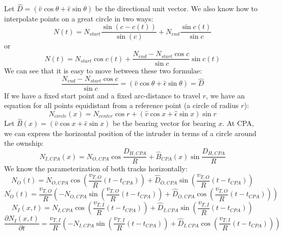 Let \(\hat{D} = (\hat{v}\cos{\theta}+\hat{\epsilon}\sin{\theta})\) be the directional unit vector. We also know how to interpolate points on a great circle in two ways:
\begin{equation}
    N(t) = N_{start}\frac{\sin{(c-c(t))}}{\sin(c)} + N_{end}\frac{\sin{c(t)}}{\sin{c}}
\end{equation}
or
\begin{equation}
    N(t) = N_{start}\cos{c(t)} + \frac{N_{end}-N_{start}\cos{c}}{\sin{c}}\sin{c(t)}
\end{equation}
We can see that it is easy to move between these two formulae:
\begin{equation}
    \frac{N_{end}-N_{start}\cos{c}}{\sin{c}} = (\hat{v}\cos{\theta + \hat{\epsilon}}\sin{\theta}) = \hat{D}
\end{equation}
If we have a fixed start point and a fixed arc-distance to travel \(r\), we have an equation for all points equidistant from a reference point (a circle of radius \(r\)):
\begin{equation}
    N_{circle}(x) = N_{center}\cos{r} + (\hat{v}\cos{x} + \hat{\epsilon}\sin{x})\sin{r}
\end{equation}
Let \(\hat{B}(x) = (\hat{v}\cos{x} + \hat{\epsilon}\sin{x})\) be the bearing vector for bearing \(x\). At CPA, we can express the horizontal position of the intruder in terms of a circle around the ownship:
\begin{equation}
\label{eq:nicpa}
    N_{I,CPA}(x) = N_{O,CPA}\cos{\frac{D_{H,CPA}}{R}} + \hat{B}_{CPA}(x)\sin{\frac{D_{H,CPA}}{R}}
\end{equation}
We know the parameterization of both tracks horizontally:
\begin{equation}
    N_{O}(t) = N_{O,CPA}\cos{\left( \frac{v_{T,O}}{R}(t-t_{CPA}) \right)} + \hat{D}_{O,CPA}\sin{\left( \frac{v_{T,O}}{R}(t-t_{CPA}) \right)}
\end{equation}
\begin{equation}
    N^{'}_{O}(t) = \frac{v_{T,O}}{R} \left(-N_{O,CPA} \sin{\left( \frac{v_{T,O}}{R}(t-t_{CPA}) \right)} + \hat{D}_{O,CPA}\cos{\left( \frac{v_{T,O}}{R}(t-t_{CPA}) \right)} \right)
\end{equation}
\begin{equation}
    N_{I}(x,t) = N_{I,CPA}\cos{\left( \frac{v_{T,I}}{R}(t-t_{CPA}) \right)} + \hat{D}_{I,CPA}\sin{\left( \frac{v_{T,I}}{R}(t-t_{CPA}) \right)}
\end{equation}
\begin{equation}
    \frac{\partial N_{I}(x,t)}{\partial t} = \frac{v_{T,I}}{R} \left(-N_{I,CPA} \sin{\left( \frac{v_{T,I}}{R}(t-t_{CPA}) \right)} + \hat{D}_{I,CPA}\cos{\left( \frac{v_{T,I}}{R}(t-t_{CPA}) \right)} \right)
\end{equation}
